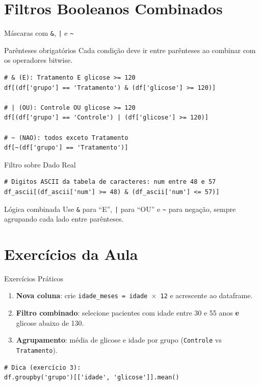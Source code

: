 \documentclass[aspectratio=169, 10pt]{beamer}
\begin{document}
\section{Filtros Booleanos Combinados}

\begin{frame}[fragile]{Máscaras com \texttt{\&}, \texttt{|} e \texttt{\textasciitilde}}
  \begin{alertblock}{Parênteses obrigatórios}
    Cada condição deve ir entre parênteses ao combinar com os operadores bitwise.
  \end{alertblock}
  \begin{lstlisting}
# & (E): Tratamento E glicose >= 120
df[(df['grupo'] == 'Tratamento') & (df['glicose'] >= 120)]

# | (OU): Controle OU glicose >= 120
df[(df['grupo'] == 'Controle') | (df['glicose'] >= 120)]

# ~ (NAO): todos exceto Tratamento
df[~(df['grupo'] == 'Tratamento')]
  \end{lstlisting}
\end{frame}

\begin{frame}[fragile]{Filtro sobre Dado Real}
  \begin{lstlisting}
# Digitos ASCII da tabela de caracteres: num entre 48 e 57
df_ascii[(df_ascii['num'] >= 48) & (df_ascii['num'] <= 57)]
  \end{lstlisting}
  \begin{block}{Lógica combinada}
    Use \texttt{\&} para ``E'', \texttt{|} para ``OU'' e \texttt{\textasciitilde} para negação, sempre agrupando cada lado entre parênteses.
  \end{block}
\end{frame}

\section{Exercícios da Aula}

\begin{frame}[fragile]{Exercícios Práticos}
  \begin{enumerate}
    \item \textbf{Nova coluna}: crie \texttt{idade\_meses = idade $\times$ 12} e acrescente ao dataframe.
    \item \textbf{Filtro combinado}: selecione pacientes com idade entre 30 e 55 anos \textbf{e} glicose abaixo de 130.
    \item \textbf{Agrupamento}: média de glicose e idade por grupo (\texttt{Controle} vs \texttt{Tratamento}).
  \end{enumerate}
  \begin{lstlisting}
# Dica (exercício 3):
df.groupby('grupo')[['idade', 'glicose']].mean()
  \end{lstlisting}
\end{frame}
\end{document}
